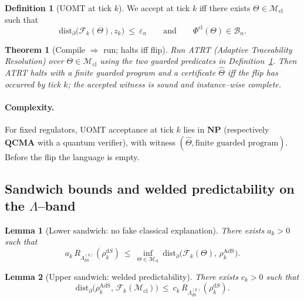 \documentclass[10pt]{article}
\theoremstyle{definition}
\newtheorem{definition}{Definition}[section]
\theoremstyle{plain}
\newtheorem{theorem}{Theorem}[section]
\newtheorem{lemma}{Lemma}[section]
\begin{document}
\begin{definition}[UOMT at tick $k$]
\label{def:uomt-8}
We accept at tick $k$ iff there exists $\Theta\in \mathcal M_{\mathrm{cl}}$ such that
\[
\mathrm{dist}_\partial\!\big(\mathcal F_k(\Theta), z_k\big)\ \le \ \varepsilon_n
\qquad\text{and}\qquad
\Phi^{\mathrm{cl}}(\Theta)\in \mathcal B_n .
\]
\end{definition}

\begin{theorem}[Compile $\Rightarrow$ run; halts iff flip]
\label{thm:compile-halts-8}
Run ATRT (Adaptive Traceability Resolution) over $\Theta\in\mathcal M_{\mathrm{cl}}$ using the two guarded predicates in Definition~\ref{def:uomt-8}.
Then ATRT halts with a finite guarded program and a certificate $\widehat \Theta$ \emph{iff} the flip has occurred by tick $k$; the accepted witness is sound and instance--wise complete.
\end{theorem}

\paragraph{Complexity.}\label{par:uom-main-203}
For fixed regulators, UOMT acceptance at tick $k$ lies in $\mathbf{NP}$ (respectively $\mathbf{QCMA}$ with a quantum verifier), with witness $(\widehat \Theta,\text{finite guarded program})$.
Before the flip the language is empty.

\subsection{\texorpdfstring{Sandwich bounds and welded predictability on the $\Lambda$--band}{Sandwich bounds and welded predictability on the Lambda--band}}
\label{subsec:sandwich-8}

\begin{lemma}[Lower sandwich: no fake classical explanation]
\label{lem:lower-sandwich}
There exists $a_k>0$ such that
\[
a_k\,R_{\Lambda^{(k)}_{\mathrm{dS}}}(\rho_k^{\mathrm dS})
\ \le\ \inf_{\Theta\in\mathcal M_{\mathrm{cl}}}\ \mathrm{dist}_\partial\!\big(\mathcal F_k(\Theta),\,\rho_k^{\mathrm{AdS}}\big).
\]
\end{lemma}

\begin{lemma}[Upper sandwich: welded predictability]
\label{lem:upper-sandwich}
There exists $c_k>0$ such that
\[
\mathrm{dist}_\partial\!\big(\rho_k^{\mathrm{AdS}},\,\mathcal F_k(\mathcal M_{\mathrm{cl}})\big)
\ \le\ c_k\,R_{\Lambda^{(k)}_{\mathrm{dS}}}(\rho_k^{\mathrm dS}).
\]
\end{lemma}
\end{document}
